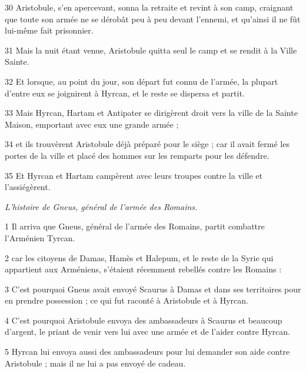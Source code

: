 \par 30 Aristobule, s'en apercevant, sonna la retraite et revint à son camp, craignant que toute son armée ne se dérobât peu à peu devant l'ennemi, et qu'ainsi il ne fût lui-même fait prisonnier.

\par 31 Mais la nuit étant venue, Aristobule quitta seul le camp et se rendit à la Ville Sainte.

\par 32 Et lorsque, au point du jour, son départ fut connu de l'armée, la plupart d'entre eux se joignirent à Hyrcan, et le reste se dispersa et partit.

\par 33 Mais Hyrcan, Hartam et Antipater se dirigèrent droit vers la ville de la Sainte Maison, emportant avec eux une grande armée ;

\par 34 et ils trouvèrent Aristobule déjà préparé pour le siège ; car il avait fermé les portes de la ville et placé des hommes sur les remparts pour les défendre.

\par 35 Et Hyrcan et Hartam campèrent avec leurs troupes contre la ville et l'assiégèrent.



\par \textit{L'histoire de Gneus, général de l'armée des Romains.}

\par 1 Il arriva que Gneus, général de l'armée des Romains, partit combattre l'Arménien Tyrcan.

\par 2 car les citoyens de Damas, Hamès et Halepum, et le reste de la Syrie qui appartient aux Arméniens, s'étaient récemment rebellés contre les Romains :

\par 3 C'est pourquoi Gneus avait envoyé Scaurus à Damas et dans ses territoires pour en prendre possession ; ce qui fut raconté à Aristobule et à Hyrcan.

\par 4 C'est pourquoi Aristobule envoya des ambassadeurs à Scaurus et beaucoup d'argent, le priant de venir vers lui avec une armée et de l'aider contre Hyrcan.

\par 5 Hyrcan lui envoya aussi des ambassadeurs pour lui demander son aide contre Aristobule ; mais il ne lui a pas envoyé de cadeau.

